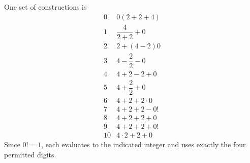One set of constructions is\[\begin{array}{c|l}0&0(2+2+4)\\1&\dfrac{4}{2+2}+0\\2&2+(4-2)0\\3&4-\dfrac{2}{2}-0\\4&4+2-2+0\\5&4+\dfrac{2}{2}+0\\6&4+2+2\cdot 0\\7&4+2+2-0!\\8&4+2+2+0\\9&4+2+2+0!\\10&4\cdot 2+2+0\end{array}\]Since $0!=1$, each evaluates to the indicated integer and uses exactly the four permitted digits.

